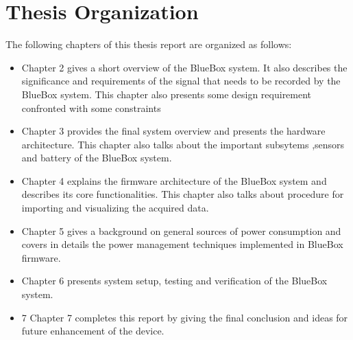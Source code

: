 \section{Thesis Organization}
The following chapters of this thesis report are organized as follows:
\begin{itemize}
	\item Chapter 2 gives a short overview of the BlueBox system. It also describes the significance and  requirements of the signal that needs to be recorded by the BlueBox system. This chapter also presents some design requirement confronted with some constraints
	
	\item Chapter 3 provides the final system overview and presents the hardware architecture. This chapter also talks about the important subsytems ,sensors and battery of the BlueBox system.
	
	\item  Chapter 4 explains the firmware architecture of the BlueBox system and describes its core functionalities. This chapter also talks about procedure for importing and visualizing the acquired data.
	
	\item Chapter 5 gives a background on general sources of power consumption and covers in details the power management techniques implemented in BlueBox firmware.
	
	\item Chapter 6 presents system setup, testing and verification of the BlueBox system. 
	
	\item 7
	Chapter 7 completes this report by giving the final conclusion and ideas for future enhancement of the device.
	
\end{itemize}
